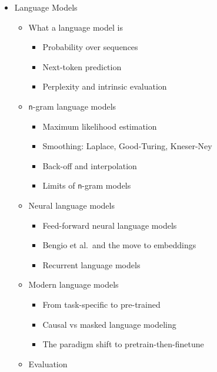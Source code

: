 \documentclass[
]{article}
\providecommand{\tightlist}{%
  \setlength{\itemsep}{0pt}\setlength{\parskip}{0pt}}
\begin{document}
\begin{itemize}
\begin{itemize}
    \begin{itemize}
    \tightlist
    \item
      Mapping monolingual spaces
    \item
      \texttt{MUSE} and adversarial alignment
    \item
      Multilingual joint training
    \end{itemize}
  \end{itemize}
\item
  Language Models

  \begin{itemize}
  \tightlist
  \item
    What a language model is

    \begin{itemize}
    \tightlist
    \item
      Probability over sequences
    \item
      Next-token prediction
    \item
      Perplexity and intrinsic evaluation
    \end{itemize}
  \item
    \texttt{n}-gram language models

    \begin{itemize}
    \tightlist
    \item
      Maximum likelihood estimation
    \item
      Smoothing: Laplace, Good-Turing, Kneser-Ney
    \item
      Back-off and interpolation
    \item
      Limits of \texttt{n}-gram models
    \end{itemize}
  \item
    Neural language models

    \begin{itemize}
    \tightlist
    \item
      Feed-forward neural language models
    \item
      Bengio et al.~and the move to embeddings
    \item
      Recurrent language models
    \end{itemize}
  \item
    Modern language models

    \begin{itemize}
    \tightlist
    \item
      From task-specific to pre-trained
    \item
      Causal vs masked language modeling
    \item
      The paradigm shift to pretrain-then-finetune
    \end{itemize}
  \item
    Evaluation


\end{itemize}
\end{itemize}
\end{document}
